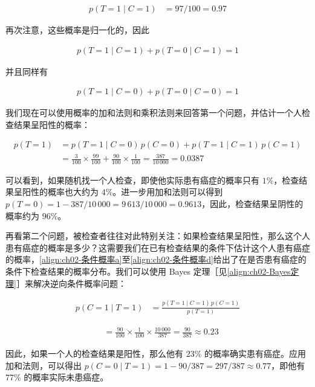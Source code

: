 \documentclass[../../main.tex]{subfiles}
\begin{document}
\begin{align}
  p(T=1\mid C=1) &= 97/100 = 0.97
  \label{align:ch02-条件概率d}
\end{align}

再次注意，这些概率是归一化的，因此

\begin{align}
  p(T=1\mid C=1) + p(T=0\mid C=1) = 1
  \label{align:ch02-条件归一化C1}
\end{align}

并且同样有

\begin{align}
  p(T=1\mid C=0) + p(T=0\mid C=0) = 1
  \label{align:ch02-条件归一化C0}
\end{align}

\begin{example}[ 癌症检查的定量分析]\label{example:ch02-癌症检查定量}
我们现在可以使用概率的加和法则和乘积法则来回答第一个问题，并估计一个人检查结果呈阳性的概率：

\begin{align}
  p(T=1) &= p(T=1\mid C=0)\,p(C=0) + p(T=1\mid C=1)\,p(C=1) \nonumber \\
  &= \frac{3}{100}\times\frac{99}{100} + \frac{90}{100}\times\frac{1}{100} = \frac{387}{10\,000} = 0.0387
  \label{align:ch02-阳性概率}
\end{align}

可以看到，如果随机找一个人检查，即使他实际患有癌症的概率只有 $1\%$，检查结果呈阳性的概率也大约为 $4\%$。进一步用加和法则可以得到 $p(T=0)=1-387/10\,000=9\,613/10\,000=0.9613$，因此，检查结果呈阴性的概率约为 $96\%$。

再看第二个问题，被检查者往往对此特别关注：如果检查结果呈阳性，那么这个人患有癌症的概率是多少？这需要我们在已有检查结果的条件下估计这个人患有癌症的概率，\eqref{align:ch02-条件概率a}至\eqref{align:ch02-条件概率d}给出了在是否患有癌症的条件下检查结果的概率分布。我们可以使用 Bayes 定理［见\eqref{align:ch02-Bayes定理}］来解决逆向条件概率问题：

\begin{align}
  p(C=1\mid T=1) &= \frac{p(T=1\mid C=1)\,p(C=1)}{p(T=1)}
  \label{align:ch02-后验概率公式}
\end{align}

\begin{align}
  &= \frac{90}{100}\times\frac{1}{100}\times\frac{10\,000}{387} = \frac{90}{387} \approx 0.23
  \label{align:ch02-后验概率数值}
\end{align}

因此，如果一个人的检查结果是阳性，那么他有 $23\%$ 的概率确实患有癌症。应用加和法则，可以得出 $p(C=0\mid T=1)=1-90/387=297/387\approx0.77$，即他有 $77\%$ 的概率实际未患癌症。
\end{example}
\end{document}
